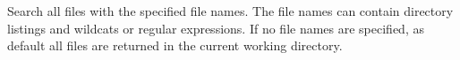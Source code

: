 %


Search all files with the specified file names. The file names can contain 
directory listings and wildcats  or regular expressions.
If no file names are specified, as default all files are returned in the 
current working directory.

